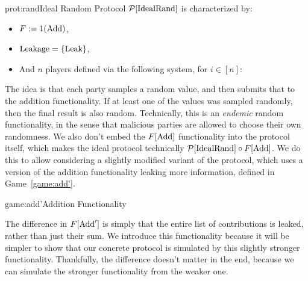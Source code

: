 \begin{protocol}{prot:rand}{Ideal Random Protocol}
$\mathcal{P}[\text{IdealRand}]$ is characterized by:
\begin{itemize}
    \item $F := 1(\text{Add})$,
    \item $\text{Leakage} = \{\text{Leak}\}$,
    \item And $n$ players defined via the following system, for $i \in [n]$:
\end{itemize}
\end{protocol}

The idea is that each party samples a random value, and then submits
that to the addition functionality.
If at least one of the values was sampled randomly, 
then the final result is also random.
Technically, this is an \emph{endemic} random functionality,
in the sense that malicious parties are allowed to choose their own randomness.
We also don't embed the $F[\text{Add}]$ functionality into the protocol itself,
which makes the ideal protocol technically $\mathcal{P}[\text{IdealRand}] \circ F[\text{Add}]$.
We do this to allow considering a slightly modified variant of the protocol,
which uses a version of the addition functionality leaking more information,
defined in Game~\ref{game:add'}.

\begin{game}{game:add'}{Addition Functionality}
\end{game}

The difference in $F[\text{Add}']$ is simply that the entire list of contributions
is leaked, rather than just their sum.
We introduce this functionality because it will be simpler
to show that our concrete protocol is simulated by this slightly stronger functionality.
Thankfully, the difference doesn't matter in the end, because we can simulate
the stronger functionality from the weaker one.

